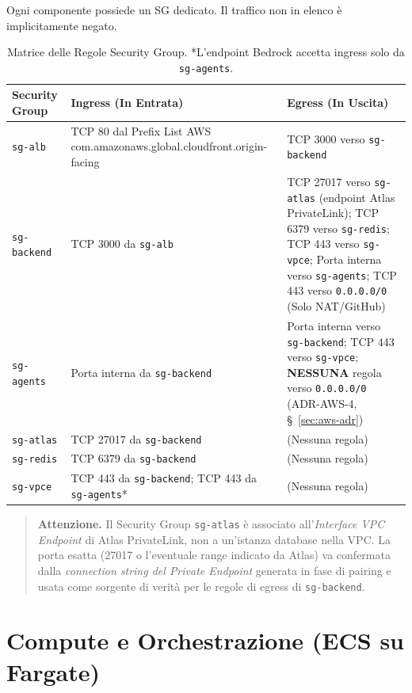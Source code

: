\documentclass[11pt,a4paper]{article}
\begin{document}
Ogni componente possiede un SG dedicato. Il traffico non in elenco è implicitamente negato.

\begin{table}[H]
\centering
\caption{Matrice delle Regole Security Group. *L'endpoint Bedrock accetta ingress solo da \texttt{sg-agents}.}
\label{tab:aws-sg}
\vspace{2mm}
\renewcommand{\arraystretch}{1.2}
\begin{tabularx}{\textwidth}{|l|X|X|}
\hline
\textbf{Security Group} & \textbf{Ingress (In Entrata)} & \textbf{Egress (In Uscita)} \\ \hline
\texttt{sg-alb} & TCP 80 dal Prefix List AWS {\ttfamily com.\allowbreak{}amazonaws.\allowbreak{}global.\allowbreak{}cloudfront.\allowbreak{}origin-facing} & TCP 3000 verso \texttt{sg-backend} \\ \hline
\texttt{sg-backend} & TCP 3000 da \texttt{sg-alb} & TCP 27017 verso \texttt{sg-atlas} (endpoint Atlas PrivateLink); TCP 6379 verso \texttt{sg-redis}; TCP 443 verso \texttt{sg-vpce}; Porta interna verso \texttt{sg-agents}; TCP 443 verso \texttt{0.0.0.0/0} (Solo NAT/GitHub) \\ \hline
\texttt{sg-agents} & Porta interna da \texttt{sg-backend} & Porta interna verso \texttt{sg-backend}; TCP 443 verso \texttt{sg-vpce}; \textbf{NESSUNA} regola verso \texttt{0.0.0.0/0} (ADR-AWS-4, \S~\ref{sec:aws-adr}) \\ \hline
\texttt{sg-atlas} & TCP 27017 da \texttt{sg-backend} & (Nessuna regola) \\ \hline
\texttt{sg-redis} & TCP 6379 da \texttt{sg-backend} & (Nessuna regola) \\ \hline
\texttt{sg-vpce} & TCP 443 da \texttt{sg-backend}; TCP 443 da \texttt{sg-agents}* & (Nessuna regola) \\ \hline
\end{tabularx}
\end{table}

\begin{quote}
\textbf{Attenzione.} Il Security Group \texttt{sg-atlas} è associato all'\emph{Interface VPC Endpoint} di Atlas PrivateLink, non a un'istanza database nella VPC. La porta esatta (27017 o l'eventuale range indicato da Atlas) va confermata dalla \emph{connection string del Private Endpoint} generata in fase di pairing e usata come sorgente di verità per le regole di egress di \texttt{sg-backend}.
\end{quote}

\section{Compute e Orchestrazione (ECS su Fargate)}
\label{sec:aws-compute}
\end{document}
